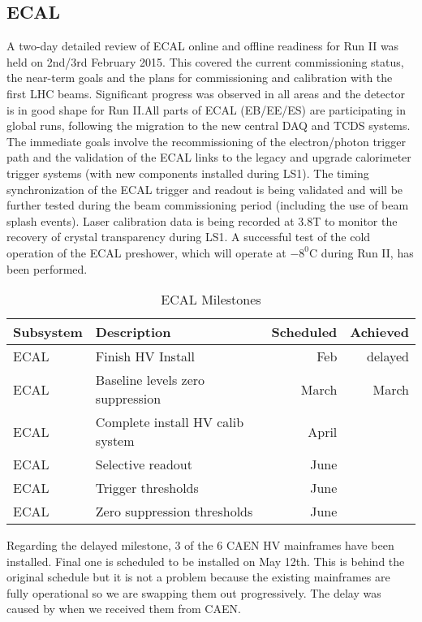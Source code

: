 \documentclass[12pt]{article}
\begin{document}
\subsection{ECAL}
A two-day detailed review of ECAL online and offline readiness for Run II was held on 2nd/3rd February 2015. This covered the current commissioning status,  the near-term goals and the plans for commissioning and calibration with the first LHC beams. Significant progress was observed in all areas and the detector is in good shape for Run II.All parts of ECAL (EB/EE/ES) are participating in global runs, following the migration to the new central DAQ and TCDS systems. The immediate goals involve the recommissioning of the electron/photon trigger path and the validation of the ECAL links to the legacy and upgrade calorimeter trigger systems (with new components installed during LS1). The timing synchronization of the ECAL trigger and readout is being validated and will be further tested during the beam commissioning period (including the use of beam splash events). Laser calibration data is being recorded at 3.8T to monitor the recovery of crystal transparency during LS1. A successful test of the cold operation of the ECAL preshower, which will operate at $-8^{0}$C during Run II, has been performed.
\begin{table}[htdp]
\caption{ECAL Milestones}
\begin{center}
\begin{tabular}{|l|l|r|r|}
\hline
Subsystem&Description&Scheduled&Achieved\\
\hline
ECAL & Finish HV Install& Feb & delayed\\
\hline
ECAL & Baseline levels zero suppression& March & March \\
\hline
ECAL & Complete install HV calib system & April &\\
\hline
ECAL & Selective readout& June & \\
\hline
ECAL & Trigger thresholds & June & \\
\hline
ECAL & Zero suppression thresholds & June & \\
\hline
\end{tabular}
\end{center}
\label{ECALMilestones}
\end{table}%

Regarding the delayed milestone, 3 of the 6 CAEN HV mainframes have been installed. Final one is scheduled to be installed on May 12th. This is behind the original schedule but it is
not a problem because the existing mainframes are fully operational so we are swapping them out progressively. The delay was caused by when we 
received them from CAEN.
\end{document}
